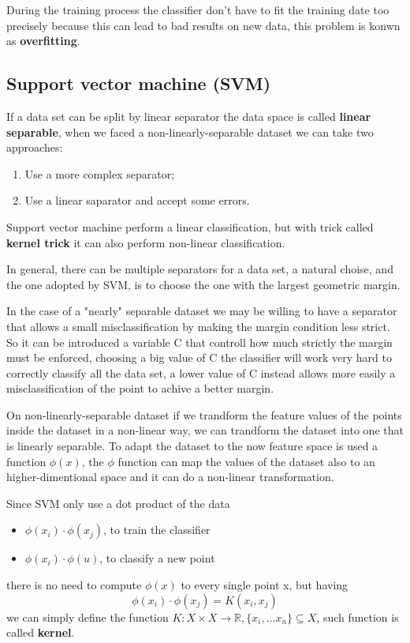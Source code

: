 \documentclass[12pt]{article}
\begin{document}
During the training process the classifier don't have to fit the training date 
too precisely because this can lead to bad results on new data, this problem is konwn
as \textbf{overfitting}. 

\subsection{Support vector machine (SVM)}

If a data set can be split by linear separator the data space is called
\textbf{linear separable}, when we faced a non-linearly-separable dataset we can take
two approaches:
\begin{enumerate}
    \item Use a more complex separator;
    \item Use a linear saparator and accept some errors.
\end{enumerate}

Support vector machine perform a linear classification, but with trick called 
\textbf{kernel trick} it can also perform non-linear classification.

In general, there can be multiple separators for a data set, a natural choise, and
the one adopted by SVM, is to choose the one with the largest geometric margin.

In the case of a "nearly" separable dataset we may be willing to have a separator
that allows a small misclassification by making the margin condition less strict.
So it can be introduced a variable C that controll how much strictly the margin 
must be enforced, choosing a big value of C the classifier will work very hard
to correctly classify
all the data set, a lower value of C instead allows more easily a 
misclassification of the point to achive a better margin.

On non-linearly-separable dataset if we trandform the feature values of the points
inside the dataset in a non-linear way, we can trandform the dataset into one that
is linearly separable. To adapt the dataset to the now feature space is used a
function $\phi(x)$, the $\phi$ function can map the values of the dataset also to 
an higher-dimentional space and it can do a non-linear transformation.

Since SVM only use a dot product of the data
\begin{itemize}
    \item $\phi(x_i) \cdot \phi(x_j)$, to train the classifier
    \item $\phi(x_i) \cdot \phi(u)$, to classify a new point
\end{itemize}
there is no need to compute $\phi(x)$ to every single point x, but having
$$
    \phi(x_i) \cdot \phi(x_j)  = K(x_i, x_j)
$$
we can simply define the function 
$K : X \times X \to\mathbb{R}, \{x_i,\dots x_n\} \subseteq X$, such function is 
called \textbf{kernel}.
\end{document}
